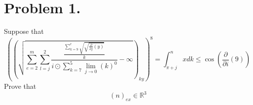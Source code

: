 \documentclass{article}
\begin{document}
\section{Problem 1.}
Suppose that$$
{\left(\left({\sqrt{\sum_{e=2}^{m}\sum_{l=j}^{2}\frac{\frac{\sum_{k=9}^{e}\sqrt{\sqrt{\frac{\partial}{\partial j} \left(y\right)}}}{k}}{i\odot \sum_{k=7}^{5}\lim_{j\rightarrow 0}{\left(k\right)}^{0}}-\infty }}\right)_{ky}\right)}^{8} = \int_{\pi +j}^{n}x d k\le \cos \left(\frac{\partial}{\partial i} \left(9\right)\right)
$$
Prove that$$
\left({n}\right)_{ex}\in \mathbb{R}^{3}
$$
\end{document}
